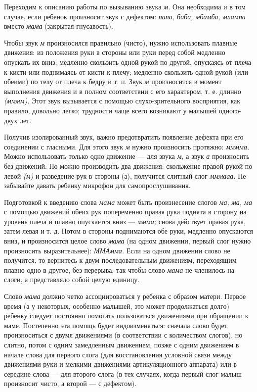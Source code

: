 \documentclass{book}
\renewcommand{\emph}[1]{\textit{#1}}
\begin{document}
Переходим к описанию работы по вызыванию звука \emph{м.} Она необходима
и в том случае, если ребенок произносит звук с дефектом: \emph{папа,
баба, мбамба, мпампа} вместо \emph{мама} (закрытая гнусавость).

Чтобы звук \emph{м} произносился правильно (чисто), нужно использовать
плавные движения: из положения руки в стороны или руки перед собой
медленно опускать их вниз; медленно скользить одной рукой по другой,
опускаясь от плеча к кисти или поднимаясь от кисти к плечу; медленно
скользить одной рукой (или обеими) по телу от плеча к бедру и т. п. Звук
\emph{м} произносится в момент выполнения движения и в полном
соответствии с его характером, т. е. длинно \emph{(мммм).} Этот звук
вызывается с помощью слухо-зрительного восприятия, как правило, довольно
легко; трудности чаще всего возникают у малышей одного-двух лет.

Получив изолированный звук, важно предотвратить появление дефекта при
его соединении с гласными. Для этого звук \emph{м} нужно произносить
протяжно: \emph{мммма.} Можно использовать только одно движение --- для
звука \emph{м,} а звук \emph{а} произносить без движений. Но можно
производить два движения: скольжение правой рукой по левой \emph{(м)} и
разведение рук в стороны (а), получится слитный слог \emph{мммааа.} Не
забывайте давать ребенку микрофон для самопрослушивания.

Подготовкой к введению слова \emph{мама} может быть произнесение слогов
\emph{ма, ма, ма} с помощью движений обеих рук попеременно правая рука
поднята в сторону на уровень плеча и плавно опускается вниз ---
\emph{ммма;} снова действует правая рука, затем левая и т. д. Потом в
стороны поднимаются обе руки, медленно опускаются вниз, и произносится
целое слово \emph{мама} (на одном движении, первый слог нужно
произносить выразительнее): \emph{ММАмма.} Если на одном движении слово
не получится, то вернитесь к двум последовательным движениям,
переходящим плавно одно в другое, без перерыва, так чтобы слово
\emph{мама} не членилось на слоги, а представляло собой целую единицу.

Слово \emph{мама} должно четко ассоциироваться у ребенка с образом
матери. Первое время (а у некоторых, особенно малышей, это может
продолжаться долго) ребенку следует постоянно помогать пользоваться
движениями при обращении к маме. Постепенно эта помощь будет
видоизменяться: сначала слово будет произноситься с двумя движениями (в
соответствии с количеством слогов), но слитно, потом с одним замедленным
движением, позже с одним движением в начале слова для первого слога (для
восстановления условной связи между движениями руки и мелкими движениями
артикуляционного аппарата) или в середине слова --- для второго слога (в
тех случаях, когда первый слог малыш произносит чисто, а второй --- с
дефектом).
\end{document}

